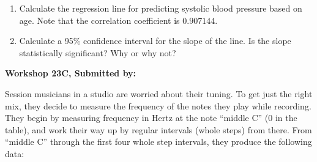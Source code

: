 \documentclass[11pt, chapterprefix=true]{scrbook}\usepackage[]{graphicx}\usepackage[]{color}
\begin{document}
\begin{exercises}
\begin{exercise}
\begin{enumerate}
  \item Calculate the regression line for predicting systolic blood pressure based on age. Note that the correlation coefficient is $0.907144$.

  \item Calculate a 95\% confidence interval for the slope of the line.  Is the slope statistically significant?  Why or why not?
  
\end{enumerate}

\end{exercise}
\begin{solution}  %

\end{solution}

\clearpage

    \begin{exercise}  %

    \begin{center}
\begin{flushleft}\textbf{\large \hfill Workshop 23C, Submitted by: }\end{flushleft}

\end{center}

Session musicians in a studio are worried about their tuning. To get just the right mix, they decide to measure the frequency of the notes they play while recording. They begin by measuring frequency in Hertz at the note ``middle C'' (0 in the table), and work their way up by regular intervals (whole steps) from there. From ``middle C'' through the first four whole step intervals, they produce the following data:


\end{exercise}
\end{exercises}
\end{document}
